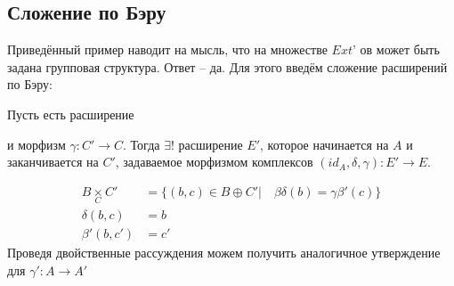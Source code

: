 \documentclass[../hw_main.tex]{subfiles}
\begin{document}
\subsection{Сложение по Бэру}
Приведённый пример наводит на мысль, что на множестве $Ext$' ов может быть задана групповая структура. Ответ -- да. Для этого введём сложение расширений по Бэру:
\begin{to_claim}
Пусть есть расширение  и морфизм $\gamma\colon C' \rightarrow C$. Тогда $\exists ! $ расширение $E'$, которое начинается на $A$ и заканчивается на $C'$, задаваемое морфизмом комплексов $(id_{A}, \delta, \gamma): E' \rightarrow E$.
\bee
{}
\eee
\begin{align*}
    B \underset{C}{\times} C' &= \{ (b, c)\in B\oplus C' |\quad \beta\delta (b) = \gamma\beta' (c)\}\\
    \delta(b, c) &= b\\
    \beta'(b, c') &= c'
\end{align*}
Проведя двойственные рассуждения можем получить аналогичное утверждение для $\gamma'\colon A \rightarrow A'$\\
\bee
{}
\eee
\end{to_claim}
\end{document}
